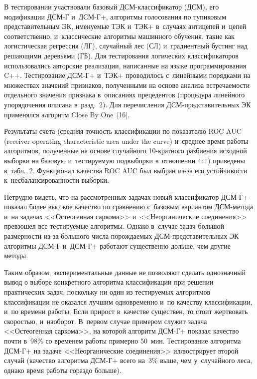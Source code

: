 \begin{multicols}{2}
  В тестировании участ\-во\-ва\-ли базовый ДСМ-клас\-си\-фи\-ка\-тор (ДСМ), его 
модификации \mbox{ДСМ-Г} и~ДСМ-Г+, алгоритмы голосования по тупиковым 
представительным ЭК, именуемые ТЭК и~ТЭК+ в~случаях антицепей и~цепей 
соответственно, и~классические алгоритмы машинного обучения, такие как 
логистическая регрессия (ЛГ), случайный лес (СЛ) и~градиентный бустинг над 
ре\-ша\-ющи\-ми деревьями (ГБ). Для тестирования логических классификаторов 
использовались авторские реализации, написанные на языке программирования 
C++. Тестирование ДСМ-Г+ и~ТЭК+ проводилось с~линейными порядками на 
множествах значений признаков, полученными на основе анализа 
встречаемости отдельного значения признака в~описаниях прецедентов 
(процедура линейного упорядочения описана в~разд.~2). Для перечисления 
ДСМ-пред\-ста\-ви\-тель\-ных ЭК применялся алгоритм Close By One~[16]. 

  Результаты счета (средняя точность классификации по показателю ROC AUC (receiver operating characteristic
  area under the curve) и~среднее время работы алгоритмов, полученные на основе случайного  
10-крат\-но\-го разбиения исходной выборки на базовую и~тестируемую 
подвыборки в~отношении $4:1$) приведены в~табл.~2. Функционал качества 
ROC AUC был выбран из-за его устойчивости к~несбалансированности 
выборки.
  
  Нетрудно видеть, что на рассмотренных задачах новый классификатор ДСМ-Г+ 
показал более высокое качество по сравнению с~базовым вариантом  
ДСМ-ме\-то\-да и~на задачах <<Остеогенная саркома>> и~<<Неорганические 
соединения>> превзошел все тестируемые алгоритмы. Однако в~случае задач 
большой размерности из-за большого числа по\-рож\-да\-емых  
ДСМ-пред\-ста\-ви\-тель\-ных ЭК алгоритмы ДСМ-Г и~ДСМ-Г+ работают 
существенно дольше, чем другие методы. 
  

  
  
  Таким образом, экспериментальные данные не позволяют сделать 
однозначный вывод о выборе конкретного алгоритма классификации при 
решении практических задач, поскольку ни один из тес\-ти\-ру\-емых алгоритмов 
классификации не оказался лучшим одновременно и~по качеству 
классификации, и~по времени работы. Если прирост в~качестве существен, то 
стоит жертвовать скоростью, и~наоборот. В~первом случае примером служит 
задача <<Остеогенная саркома>>, на которой алгоритм ДСМ-Г+ показал 
качество почти в~98\% со временем работы примерно 50~мин. Тестирование 
алгоритма ДСМ-Г+ на задаче <<Неорганические соединения>> иллюстрирует 
второй случай (качество алгоритма ДСМ-Г+ всего на~3\% выше, чем 
у~случайного леса, однако время работы гораздо больше).
  

\end{multicols}
